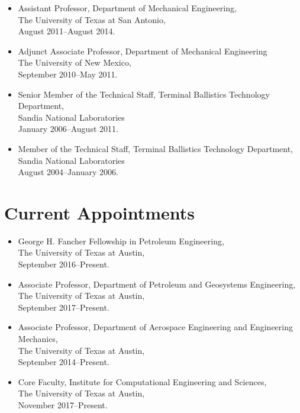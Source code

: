 \begin{itemize}
    \item Assistant Professor, Department of Mechanical Engineering, \\ 
          The University of Texas at San Antonio,\\
          August 2011--August 2014. 

    \item Adjunct Associate Professor, Department of Mechanical Engineering \\
          The University of New Mexico, \\ 
          September 2010--May 2011.

    \item Senior Member of the Technical Staff, Terminal Ballistics Technology Department, \\ 
          Sandia National Laboratories \\
          January 2006--August 2011.

    \item Member of the Technical Staff, Terminal Ballistics Technology Department, \\ 
          Sandia National Laboratories\\
          August 2004--January 2006.
\end{itemize}
\else
\section*{Current Appointments}

\begin{itemize}
    \item George H. Fancher Fellowship in Petroleum Engineering, \\ 
          The University of Texas at Austin, \\
          September 2016--Present. 

    \item Associate Professor, Department of Petroleum and Geosystems Engineering, \\ 
          The University of Texas at Austin, \\
          September 2017--Present. 

      \item Associate Professor, Department of Aerospace Engineering and Engineering Mechanics, \\ 
          The University of Texas at Austin, \\
          September 2014--Present. 

    \item Core Faculty, Institute for Computational Engineering and Sciences, \\ 
          The University of Texas at Austin, \\
          November 2017--Present. 
\end{itemize}
\fi

